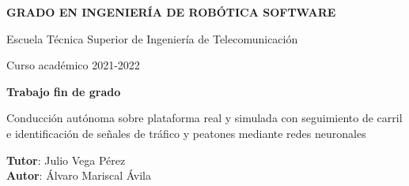 \thispagestyle{empty}
\vspace{2cm}

\begin{figure}[htb]
	\centerline{}
\end{figure}

\begin{center}
	{\Large {\bf GRADO EN INGENIERÍA DE ROBÓTICA SOFTWARE}}
	\vspace{5mm}

	{\large {Escuela Técnica Superior de Ingeniería de Telecomunicación}}
	\vspace{5mm}

	{\large {Curso académico 2021-2022}}

	\vspace{1cm}

	{\large {\bf Trabajo fin de grado}}

	\vspace{2cm}

	{\Large {Conducción autónoma sobre plataforma real y simulada con seguimiento de carril e identificación de señales de tráfico y peatones mediante redes neuronales\\[1cm] }}

	\vspace{5cm}
	{\bf Tutor}: Julio Vega Pérez \\
	{\bf Autor}: Álvaro Mariscal Ávila
\end{center}

\clearpage
\thispagestyle{empty}
